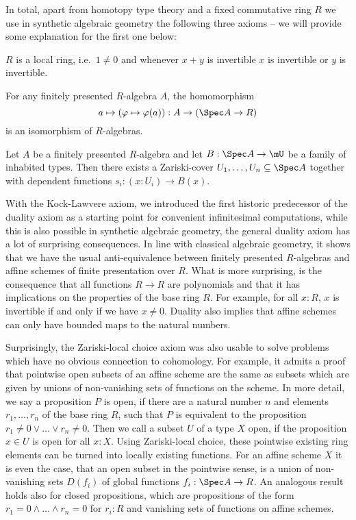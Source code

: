 In total, apart from homotopy type theory and a fixed commutative ring $R$ we use in synthetic algebraic geometry the following three axioms -- we will provide some explanation for the first one below:

\begin{center}
\begin{axiom}[Locality]%
  \label{loc-axiom}
  $R$ is a local ring, i.e.\ $1\neq 0$ and whenever $x+y$ is invertible $x$ is invertible or $y$ is invertible.
\end{axiom}

\begin{axiom}[Duality]%
  \label{duality-axiom}
  For any finitely presented $R$-algebra $A$, the homomorphism
  \[ a \mapsto (\varphi\mapsto \varphi(a)) : A \to (\Spec A \to R)\]
  is an isomorphism of $R$-algebras.
\end{axiom}

\begin{axiom}%
  \label{Z-choice-axiom}
  Let $A$ be a finitely presented $R$-algebra
  and let $B : \Spec A \to \mU$ be a family of inhabited types.
  Then there exists a Zariski-cover $U_1,\dots,U_n\subseteq \Spec A$
  together with dependent functions $s_i : (x : U_i)\to B(x)$.
\end{axiom}
\end{center}

With the Kock-Lawvere axiom, we introduced the first historic predecessor of the duality axiom as a starting point for convenient infinitesimal computations,
while this is also possible in synthetic algebraic geometry, the general duality axiom has a lot of surprising consequences.
In line with classical algebraic geometry, it shows that we have the usual anti-equivalence between finitely presented $R$-algebras and affine schemes of finite presentation over $R$.
What is more surprising, is the consequence that all functions $R\to R$ are polynomials and that it has implications on the properties of the base ring $R$.
For example, for all $x:R$, $x$ is invertible if and only if we have $x\neq 0$.
Duality also implies that affine schemes can only have bounded maps to the natural numbers.

Surprisingly, the Zariski-local choice axiom was also usable to solve problems which have no obvious connection to cohomology.
For example, it admits a proof that pointwise open subsets of an affine scheme are the same as subsets which are given by unions of non-vanishing sets of functions on the scheme.
In more detail, we say a proposition $P$ is open, if there are a natural number $n$ and elements $r_1,\dots,r_n$ of the base ring $R$,
such that $P$ is equivalent to the proposition $r_1\neq 0 \vee\dots\vee r_n\neq 0$.
Then we call a subset $U$ of a type $X$ open, if the proposition $x\in U$ is open for all $x:X$.
Using Zariski-local choice, these pointwise existing ring elements can be turned into locally existing functions.
For an affine scheme $X$ it is even the case, that an open subset in the pointwise sense, is a union of non-vanishing sets $D(f_i)$ of global functions $f_i:\Spec A \to R$.
An analogous result holds also for closed propositions, which are propositions of the form $r_1=0\wedge\dots\wedge r_n=0$ for $r_i:R$ and vanishing sets of functions on affine schemes.

